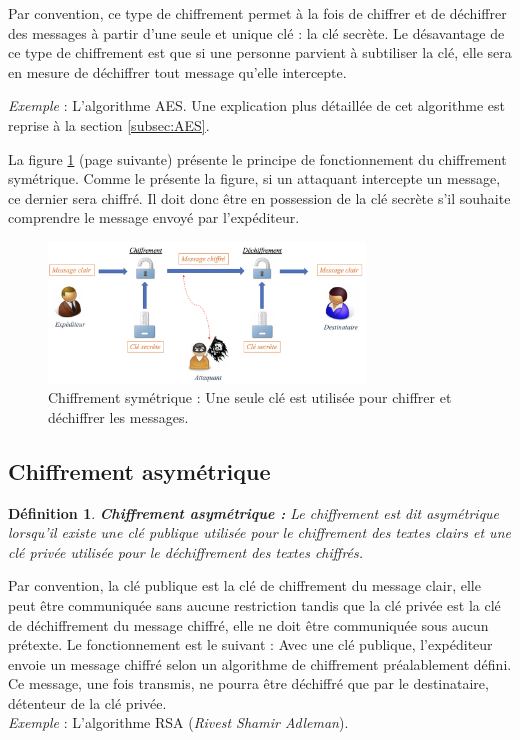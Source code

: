 \documentclass[oneside]{book}
\newtheorem{definition}{Définition}[section]
\begin{document}
\hspace{-0.5cm}Par convention, ce type de chiffrement permet à la fois de chiffrer et de déchiffrer des messages à partir d'une seule et unique clé : la clé secrète. Le désavantage de ce type de chiffrement est que si une personne parvient à subtiliser la clé, elle sera en mesure de déchiffrer tout message qu'elle intercepte. 

\hspace{-0.5cm}\textit{Exemple} : L'algorithme AES. Une explication plus détaillée de cet algorithme est reprise à la section \ref{subsec:AES}.


\hspace{-0.5cm}La figure \ref{fig:symétrique} (page suivante) présente le principe de fonctionnement du chiffrement symétrique. Comme le présente la figure, si un attaquant intercepte un message, ce dernier sera chiffré. Il doit donc être en possession de la clé secrète s'il souhaite comprendre le message envoyé par l'expéditeur.

\begin{figure}[htbp]
    \centering
    \includegraphics[width=0.75\textwidth]{image/symetrique}
    \caption{Chiffrement symétrique : Une seule clé est utilisée pour chiffrer et déchiffrer les messages.}
    \label{fig:symétrique}
\end{figure}


\newpage
\subsection{Chiffrement asymétrique}
\label{subsec:Chiffrement_asymétrique}

\theoremstyle{definition}
\begin{definition}{\textbf{Chiffrement asymétrique :}}
Le chiffrement est dit asymétrique lorsqu'il existe une clé publique utilisée pour le chiffrement des textes clairs et une clé privée utilisée pour le déchiffrement des textes chiffrés. 
\end{definition}

\hspace{-0.5cm}Par convention, la clé publique est la clé de chiffrement du message clair, elle peut être communiquée sans aucune restriction tandis que la clé privée est la clé de déchiffrement du message chiffré, elle ne doit être communiquée sous aucun prétexte. Le fonctionnement est le suivant : Avec une clé publique, l'expéditeur envoie un message chiffré selon un algorithme de chiffrement préalablement défini. Ce message, une fois transmis, ne pourra être déchiffré que par le destinataire, détenteur de la clé privée. \\
\textit{Exemple} : L'algorithme RSA (\textit{Rivest Shamir Adleman}).
\end{document}
